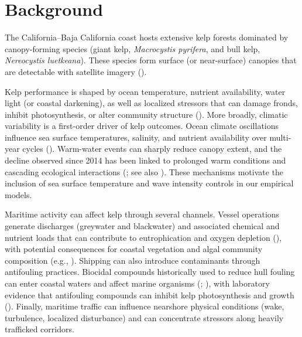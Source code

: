 \documentclass[12pt]{article}
\begin{document}
\section{Background}

The California--Baja California coast hosts extensive kelp forests dominated by canopy-forming species (giant kelp, \textit{Macrocystis pyrifera}, and bull kelp, \textit{Nereocystis luetkeana}). These species form surface (or near-surface) canopies that are detectable with satellite imagery (\citealp{Bell2023}). 

Kelp performance is shaped by ocean temperature, nutrient availability, water light (or coastal darkening), as well as localized stressors that can damage fronds, inhibit photosynthesis, or alter community structure (\citealp{Carr2019}). More broadly, climatic variability is a first-order driver of kelp outcomes. Ocean climate oscillations influence sea surface temperatures, salinity, and nutrient availability over multi-year cycles (\citealp{Castorani2022}). Warm-water events can sharply reduce canopy extent, and the decline observed since 2014 has been linked to prolonged warm conditions and cascading ecological interactions (\citealp{RogersBennett2019}; see also \citealp{Krumhansl2016}). These mechanisms motivate the inclusion of sea surface temperature and wave intensity controls in our empirical models.

Maritime activity can affect kelp through several channels. Vessel operations generate discharges (greywater and blackwater) and associated chemical and nutrient loads that can contribute to eutrophication and oxygen depletion (\citealp{Lindgren2016}), with potential consequences for coastal vegetation and algal community composition (e.g., \citealp{FilbeeDexter2018}). Shipping can also introduce contaminants through antifouling practices. Biocidal compounds historically used to reduce hull fouling can enter coastal waters and affect marine organisms (\citealp{Dafforn2011}; \citealp{Cima2022}), with laboratory evidence that antifouling compounds can inhibit kelp photosynthesis and growth (\citealp{Johansson2012}). Finally, maritime traffic can influence nearshore physical conditions (wake, turbulence, localized disturbance) and can concentrate stressors along heavily trafficked corridors.
\end{document}
